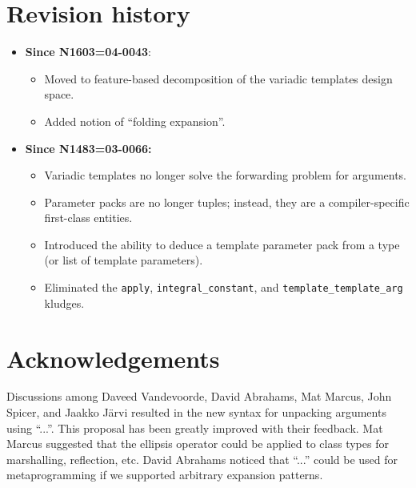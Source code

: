 \documentclass{article}
\begin{document}
\section{Revision history}
\begin{itemize}

\item \textbf{Since N1603=04-0043}:
  \begin{itemize}
  \item Moved to feature-based decomposition of the variadic templates
    design space.
  \item Added notion of ``folding expansion''.
  \end{itemize}

\item \textbf{Since N1483=03-0066:} 
  \begin{itemize}
  \item Variadic templates no longer solve the forwarding problem for
    arguments. 
  \item Parameter packs are no longer tuples; instead, they are a
    compiler-specific first-class entities.
  \item Introduced the ability to deduce a template parameter pack
    from a type (or list of template parameters).
  \item Eliminated the \texttt{apply}, \texttt{integral\_constant},
    and \texttt{template\_template\_arg} kludges.
  \end{itemize}
\end{itemize}

\section{Acknowledgements}
Discussions among Daveed Vandevoorde, David Abrahams, Mat Marcus, John
Spicer, and Jaakko J\"arvi resulted in the new syntax for unpacking
arguments using ``...''. This proposal has been greatly improved with
their feedback. Mat Marcus suggested that the ellipsis operator could
be applied to class types for marshalling, reflection, etc. David
Abrahams noticed that ``...''  could be used for metaprogramming if we
supported arbitrary expansion patterns.



\end{document}
